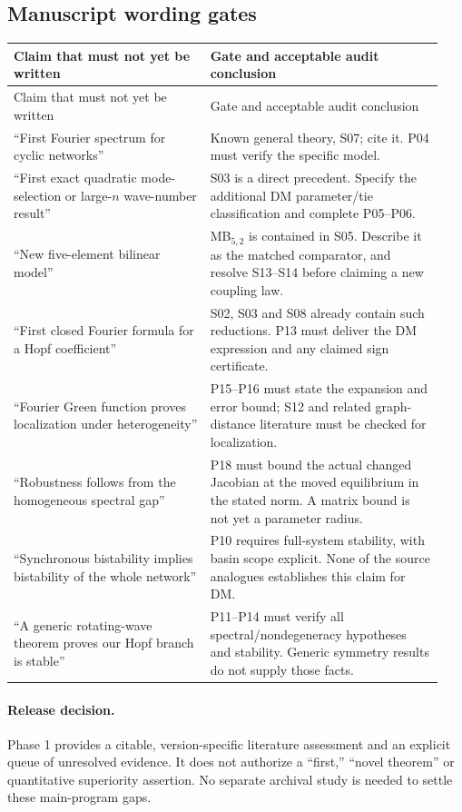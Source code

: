 \subsection{Manuscript wording gates}
\begin{longtable}{@{}>{\raggedright\arraybackslash}p{0.43\linewidth}>{\raggedright\arraybackslash}p{0.51\linewidth}@{}}
\toprule
Claim that must not yet be written & Gate and acceptable audit conclusion\\
\midrule
\endfirsthead
\toprule
Claim that must not yet be written & Gate and acceptable audit conclusion\\
\midrule
\endhead
\bottomrule
\endfoot
``First Fourier spectrum for cyclic networks'' &
Known general theory, S07; cite it. P04 must verify the specific model.\\[4pt]
``First exact quadratic mode-selection or large-$n$ wave-number result'' &
S03 is a direct precedent. Specify the additional DM parameter/tie
classification and complete P05--P06.\\[4pt]
``New five-element bilinear model'' &
MB$_{5,2}$ is contained in S05. Describe it as the matched comparator,
and resolve S13--S14 before claiming a new coupling law.\\[4pt]
``First closed Fourier formula for a Hopf coefficient'' &
S02, S03 and S08 already contain such reductions. P13 must deliver
the DM expression and any claimed sign certificate.\\[4pt]
``Fourier Green function proves localization under heterogeneity'' &
P15--P16 must state the expansion and error bound; S12 and related
graph-distance literature must be checked for localization.\\[4pt]
``Robustness follows from the homogeneous spectral gap'' &
P18 must bound the actual changed Jacobian at the moved equilibrium
in the stated norm. A matrix bound is not yet a parameter radius.\\[4pt]
``Synchronous bistability implies bistability of the whole network'' &
P10 requires full-system stability, with basin scope explicit.
None of the source analogues establishes this claim for DM.\\[4pt]
``A generic rotating-wave theorem proves our Hopf branch is stable'' &
P11--P14 must verify all spectral/nondegeneracy hypotheses and
stability. Generic symmetry results do not supply those facts.\\
\end{longtable}

\paragraph{Release decision.}
Phase 1 provides a citable, version-specific literature assessment and
an explicit queue of unresolved evidence. It does not authorize a
``first,'' ``novel theorem'' or quantitative superiority assertion.
No separate archival study is needed to settle these main-program gaps.
